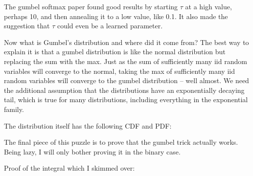 \documentclass[12pt]{article}
\begin{document}
The gumbel softmax paper found good results by starting $\tau$ at a high value, perhaps 10, and then annealing it to a low value, like 0.1. It also made the suggestion that $\tau$ could even be a learned parameter. 

Now what is Gumbel's distribution and where did it come from? The best way to explain it is that a gumbel distribution is like the normal distribution but replacing the sum with the max. Just as the sum of sufficiently many iid random variables will converge to the normal, taking the max of sufficiently many iid random variables will converge to the gumbel distribution -- well almost. We need the additional assumption that the distributions have an exponentially decaying tail, which is true for many distributions, including everything in the exponential family.

The distribution itself has the following CDF and PDF:


The final piece of this puzzle is to prove that the gumbel trick actually works. Being lazy, I will only bother proving it in the binary case. 


Proof of the integral which I skimmed over:

\end{document}
